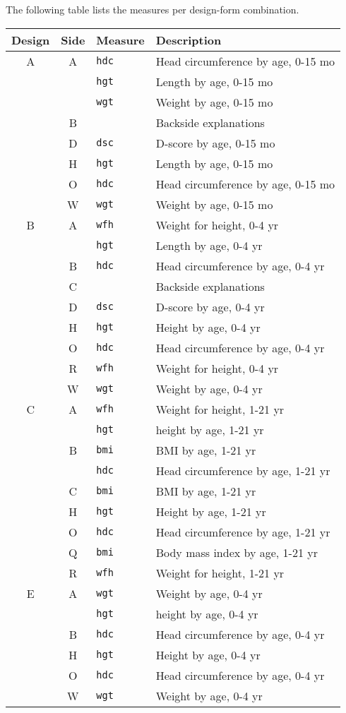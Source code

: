 \documentclass[
]{book}
\begin{document}
The following table lists the measures per design-form combination.

\begin{longtable}[]{@{}ccll@{}}
\toprule
Design & Side & Measure & Description \\
\midrule
\endhead
A & A & \texttt{hdc} & Head circumference by age, 0-15 mo \\
& & \texttt{hgt} & Length by age, 0-15 mo \\
& & \texttt{wgt} & Weight by age, 0-15 mo \\
& B & & Backside explanations \\
& D & \texttt{dsc} & D-score by age, 0-15 mo \\
& H & \texttt{hgt} & Length by age, 0-15 mo \\
& O & \texttt{hdc} & Head circumference by age, 0-15 mo \\
& W & \texttt{wgt} & Weight by age, 0-15 mo \\
B & A & \texttt{wfh} & Weight for height, 0-4 yr \\
& & \texttt{hgt} & Length by age, 0-4 yr \\
& B & \texttt{hdc} & Head circumference by age, 0-4 yr \\
& C & & Backside explanations \\
& D & \texttt{dsc} & D-score by age, 0-4 yr \\
& H & \texttt{hgt} & Height by age, 0-4 yr \\
& O & \texttt{hdc} & Head circumference by age, 0-4 yr \\
& R & \texttt{wfh} & Weight for height, 0-4 yr \\
& W & \texttt{wgt} & Weight by age, 0-4 yr \\
C & A & \texttt{wfh} & Weight for height, 1-21 yr \\
& & \texttt{hgt} & height by age, 1-21 yr \\
& B & \texttt{bmi} & BMI by age, 1-21 yr \\
& & \texttt{hdc} & Head circumference by age, 1-21 yr \\
& C & \texttt{bmi} & BMI by age, 1-21 yr \\
& H & \texttt{hgt} & Height by age, 1-21 yr \\
& O & \texttt{hdc} & Head circumference by age, 1-21 yr \\
& Q & \texttt{bmi} & Body mass index by age, 1-21 yr \\
& R & \texttt{wfh} & Weight for height, 1-21 yr \\
E & A & \texttt{wgt} & Weight by age, 0-4 yr \\
& & \texttt{hgt} & height by age, 0-4 yr \\
& B & \texttt{hdc} & Head circumference by age, 0-4 yr \\
& H & \texttt{hgt} & Height by age, 0-4 yr \\
& O & \texttt{hdc} & Head circumference by age, 0-4 yr \\
& W & \texttt{wgt} & Weight by age, 0-4 yr \\
\bottomrule
\end{longtable}
\end{document}
